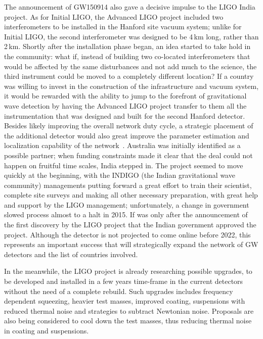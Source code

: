 The announcement of GW150914 also gave a decisive impulse to the LIGO India project. As for Initial LIGO, the Advanced LIGO project included two interferometers to be installed in the Hanford site vacuum system; unlike for Initial LIGO, the second interferometer was designed to be 4\,km long, rather than 2\,km. Shortly after the installation phase began, an idea started to take hold in the community: what if, instead of building two co-located interferometers that would be affected by the same disturbances and not add much to the science, the third instrument could be moved to a completely different location? If a country was willing to invest in the construction of the infrastructure and vacuum system, it would be rewarded with the ability to jump to the forefront of gravitational wave detection by having the Advanced LIGO project transfer to them all the instrumentation that was designed and built for the second Hanford detector. Besides likely improving the overall network duty cycle, a strategic placement of the additional detector would also great improve the parameter estimation and localization capability of the network~\cite{something}.
Australia was initially identified as a possible partner; when funding constraints made it clear that the deal could not happen on fruitful time scales, India stepped in. The project seemed to move quickly at the beginning, with the INDIGO (the Indian gravitational wave community) managements putting forward a great effort to train their scientist, complete site surveys and making all other necessary preparation, with great help and support by the LIGO management; unfortunately, a change in government slowed process almost to a halt in 2015. If was only after the announcement of the first discovery by the LIGO project that the Indian government approved the project. Although the detector is not projected to come online before 2022, this represents an important success that will strategically expand the network of GW detectors and the list of countries involved.

In the meanwhile, the LIGO project is already researching possible upgrades, to be developed and installed in a few years time-frame in the current detectors without the need of a complete rebuild. Such upgrades includes frequency dependent squeezing, heavier test masses, improved coating, suspensions with reduced thermal noise and strategies to subtract Newtonian noise. Proposals are also being considered to cool down the test masses, thus reducing thermal noise in coating and suspensions.

